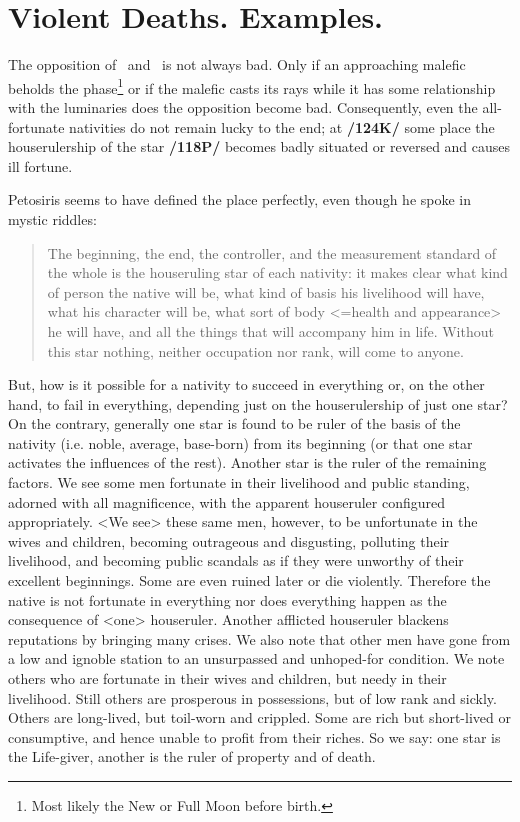 \section{Violent Deaths. Examples.}

The opposition of \Sun\, and \Moon\, is not always bad. Only if an approaching malefic beholds the phase\footnote{Most likely the New or Full Moon before birth.} or if the malefic casts its rays while it has some relationship with the luminaries does the opposition become bad. Consequently, even the all-fortunate nativities do not remain lucky to the end; at \textbf{/124K/} some place the houserulership of the star \textbf{/118P/} becomes badly situated or reversed and causes ill fortune.

Petosiris seems to have defined the place perfectly, even though he spoke in mystic riddles: \begin{quote}The
beginning, the end, the controller, and the measurement standard of the whole is the houseruling star of each nativity: it makes clear what kind of person the native will be, what kind of basis his livelihood will have, what his character will be, what sort of body <=health and appearance> he will have, and all the things that will accompany him in life. Without this star nothing, neither occupation nor rank, will come to anyone.\end{quote}

But, how is it possible for a nativity to succeed in everything or, on the other hand, to fail in everything, depending just on the houserulership of just one star? On the contrary, generally one star is found to be ruler of the basis of the nativity (i.e. noble, average, base-born) from its beginning (or that one star activates the influences of the rest). Another star is the ruler of the remaining factors. We see some men fortunate in their livelihood and public standing, adorned with all magnificence, with the apparent houseruler configured appropriately. <We see> these same men, however, to be unfortunate in the wives and children, becoming outrageous and disgusting, polluting their livelihood, and becoming public scandals as if they were unworthy of their excellent beginnings. Some are even ruined later or die violently. Therefore the native is not fortunate in everything nor does everything happen as the consequence of <one> houseruler. Another afflicted houseruler blackens reputations by bringing many crises. We also note that other men have gone from a low and ignoble station to an unsurpassed and unhoped-for condition. We note others who are fortunate in their wives and children, but needy in their livelihood. Still others are prosperous in possessions, but of low rank and sickly. Others are long-lived, but toil-worn and crippled. Some are rich but short-lived or consumptive, and hence unable to profit from their riches. So we say: one star is the Life-giver, another is the ruler of property and of death.

